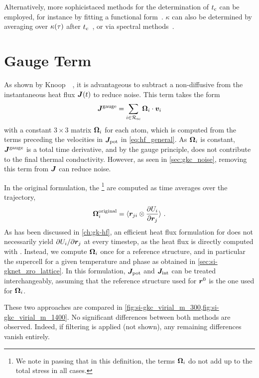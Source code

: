 Alternatively, more sophicistaced methods for the determination of $t_{\text{c}}$ can be employed, for instance by fitting a functional form~\cite{mk2004t,ccdg2000t}.
$\kappa$ can also be determined by averaging over $\kappa(\tau)$ after $t_{\text{c}}$~\cite{fpdh2015t}, or via spectral methods~\cite{emb2017t}.


\clearpage
\section{Gauge Term}
\label{sec:si-gkc_gauge_term}

As shown by Knoop~\etal~\cite{ksc2023t}, it is advantageous to subtract a non-diffusive  from the instantaneous heat flux $\boldsymbol{J}(t)$ to reduce noise.
This term takes the form
\begin{equation}
	\boldsymbol{J}^{\text{gauge}} = \sum_{i \in \mathcal{R_{\text{sc}}}} \boldsymbol{\Omega}_i \cdot \boldsymbol{v}_i
\end{equation}
with a constant $3 \times 3$ matrix $\boldsymbol{\Omega}_i$ for each atom, which is computed from the terms preceding the velocities in $\boldsymbol{J}_\text{pot}$ in \cref{eq:hf_general}. 
As $\boldsymbol{\Omega}_i$ is constant, $\boldsymbol{J}^{\text{gauge}}$ is a total time derivative, and by the gauge principle, does not contribute to the final thermal conductivity.
However, as seen in \cref{sec:gkc_noise}, removing this term from $\boldsymbol{J}$ can reduce noise.

In the original formulation, the \footnote{We note in passing that in this definition, the terms $\boldsymbol{\Omega}_i$ do not add up to the total stress in all cases.
} are computed as time averages over the trajectory, 
\begin{equation}
	\boldsymbol{\Omega}_i^{\text{original}} = \braket{\boldsymbol{r}_{ji} \otimes \frac{\partial U_{i}}{\partial \boldsymbol{r}_{j}}} \, .
\end{equation}
As has been discussed in \cref{ch:gk-hf}, an efficient heat flux formulation for \glps does not necessarily yield $\partial U_{i} / \partial \boldsymbol{r}_{j}$ at every timestep, as the heat flux is directly computed with \ad.
Instead, we compute $\boldsymbol{\Omega}_i$ once for a reference structure, and in particular the supercell for a given temperature and phase as obtained in \cref{sec:si-gknet_zro_lattice}. In this formulation, $\boldsymbol{J}_\text{pot}$ and $\boldsymbol{J}_\text{int}$ can be treated interchangeably, assuming that the reference structure used for $\boldsymbol{r}^0$ is the one used for $\boldsymbol{\Omega}_i$.

These two approaches are compared in \cref{fig:si-gkc_virial_m_300,fig:si-gkc_virial_m_1400}. No significant differences between both methods are observed. Indeed, if filtering is applied (not shown), any remaining differences vanish entirely.

